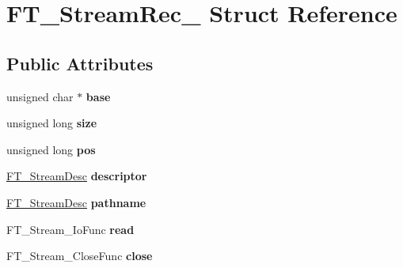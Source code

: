 \hypertarget{struct_f_t___stream_rec__}{}\section{F\+T\+\_\+\+Stream\+Rec\+\_\+ Struct Reference}
\label{struct_f_t___stream_rec__}
\subsection*{Public Attributes}
\begin{DoxyCompactItemize}
\item 
unsigned char $\ast$ {\bfseries base}\hypertarget{struct_f_t___stream_rec___a7b406cb9a60c5a8b4bd8d04b7a23cfee}{}\label{struct_f_t___stream_rec___a7b406cb9a60c5a8b4bd8d04b7a23cfee}

\item 
unsigned long {\bfseries size}\hypertarget{struct_f_t___stream_rec___ab00e3cf802c950d0ca5a022a06953123}{}\label{struct_f_t___stream_rec___ab00e3cf802c950d0ca5a022a06953123}

\item 
unsigned long {\bfseries pos}\hypertarget{struct_f_t___stream_rec___a5bf82c2ff4554752edfeec442fba2f33}{}\label{struct_f_t___stream_rec___a5bf82c2ff4554752edfeec442fba2f33}

\item 
\hyperlink{union_f_t___stream_desc__}{F\+T\+\_\+\+Stream\+Desc} {\bfseries descriptor}\hypertarget{struct_f_t___stream_rec___a361c44020eace21cc453b51852d8cc4f}{}\label{struct_f_t___stream_rec___a361c44020eace21cc453b51852d8cc4f}

\item 
\hyperlink{union_f_t___stream_desc__}{F\+T\+\_\+\+Stream\+Desc} {\bfseries pathname}\hypertarget{struct_f_t___stream_rec___afd75c5de5ed78c484a200a7e97ef5a41}{}\label{struct_f_t___stream_rec___afd75c5de5ed78c484a200a7e97ef5a41}

\item 
F\+T\+\_\+\+Stream\+\_\+\+Io\+Func {\bfseries read}\hypertarget{struct_f_t___stream_rec___af724049d0258d4988c2b11c3a08b1b05}{}\label{struct_f_t___stream_rec___af724049d0258d4988c2b11c3a08b1b05}

\item 
F\+T\+\_\+\+Stream\+\_\+\+Close\+Func {\bfseries close}\hypertarget{struct_f_t___stream_rec___a7d7c7a1d7de8f580d7ad66efe89defa9}{}\label{struct_f_t___stream_rec___a7d7c7a1d7de8f580d7ad66efe89defa9}


\end{DoxyCompactItemize}
